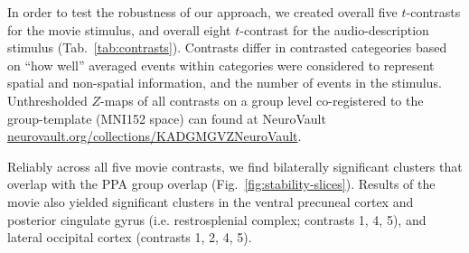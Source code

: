\documentclass[english]{article}
\begin{document}

In order to test the robustness of our approach, we created overall five
$t$-contrasts for the movie stimulus, and overall
eight $t$-contrast for the audio-description stimulus
(Tab.~\ref{tab:contrasts}).
Contrasts differ in contrasted categeories based on ``how well'' averaged events
within categories were considered to represent spatial and non-spatial
information, and the number of events in the stimulus.
Unthresholded $Z$-maps of all contrasts on a group level co-registered to the
group-template (MNI152 space) can found at NeuroVault
\href{https://neurovault.org/collections/KADGMGVZ/}{\url{neurovault.org/collections/KADGMGVZNeuroVault}}.


Reliably across all five movie contrasts, we find bilaterally significant
clusters that overlap with the PPA group overlap
(Fig.~\ref{fig:stability-slices}).
Results of the movie also yielded significant clusters in the ventral precuneal
cortex and posterior cingulate gyrus (i.e. restrosplenial complex; contrasts 1,
4, 5), and lateral occipital cortex (contrasts 1, 2, 4, 5).

\end{document}
